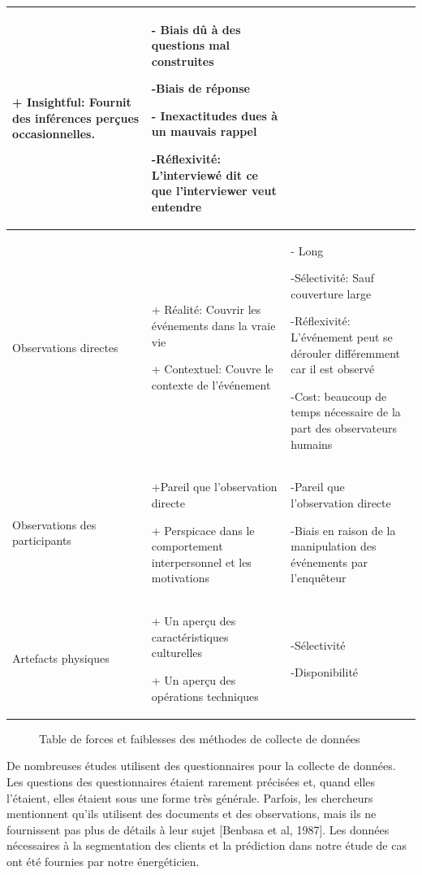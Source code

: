 \documentclass[12pt]{article}
\begin{document}
{\begin{center}
\begin{tabular}{|p{3cm}|p{6cm}|p{6cm}|}
+ Insightful: Fournit des inférences perçues occasionnelles.
 & - Biais dû à des questions mal construites
 
-Biais de réponse

- Inexactitudes dues à un mauvais rappel

-Réflexivité: L'interviewé dit ce que l'interviewer veut entendre

\\
  \hline
   Observations directes  &+ Réalité: Couvrir les événements dans la vraie vie
   
+ Contextuel: Couvre le contexte de l'événement

& - Long

-Sélectivité: Sauf couverture large


-Réflexivité: L'événement peut se dérouler différemment car il est observé

-Cost: beaucoup de temps nécessaire de la part des observateurs humains
 \\
    \hline
  Observations des participants  &+Pareil que l’observation directe
  
+ Perspicace dans le comportement interpersonnel et les motivations
 &-Pareil que l’observation directe
 
-Biais en raison de la manipulation des événements par l'enquêteur

  \\
    \hline
    Artefacts physiques &+ Un aperçu des caractéristiques culturelles

+ Un aperçu des opérations techniques

& -Sélectivité

-Disponibilité
 \\
    \hline
\end{tabular}
\end{center}


\begin{figure}[H]
	\centering
     \caption{ Table de forces et faiblesses des méthodes de collecte de données }
    \label{fig:21}
\end{figure}

De nombreuses études utilisent des questionnaires pour la collecte de données. Les questions des questionnaires étaient rarement précisées et, quand elles l'étaient, elles étaient sous une forme très générale. Parfois, les chercheurs mentionnent qu'ils utilisent des documents et des observations, mais ils ne fournissent pas plus de détails à leur sujet {\color{red}[Benbasa et al, 1987]}.
Les données nécessaires à la segmentation des clients et la prédiction dans notre étude de cas ont été fournies par notre énergéticien.


}
\end{document}
